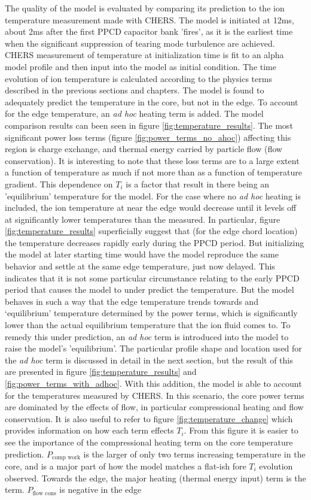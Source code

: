 The quality of the model is evaluated by comparing its prediction to the ion temperature measurement made with CHERS. The model is initiated at 12ms, about 2ms after the first PPCD capacitor bank 'fires', as it is the earliest time when the significant suppression of tearing mode turbulence are achieved. CHERS measurement of temperature at initialization time is fit to an alpha model profile and then input into the model as initial condition. The time evolution of ion temperature is calculated according to the physics terms described in the previous sections and chapters. The model is found to adequately predict the temperature in the core, but not in the edge. To account for the edge temperature, an \textit{ad hoc} heating term is added. The model comparison results can been seen in figure \ref{fig:temperature_results}.  The most significant power loss terms (figure \ref{fig:power_terms_no_ahoc}) affecting this region is charge exchange, and thermal energy carried by particle flow (flow conservation). It is interesting to note that these loss terms are to a large extent a function of temperature as much if not more than as a function of temperature gradient. This dependence on $T_i$ is a factor that result in there being an 'equilibrium' temperature for the model. For the case where no \textit{ad hoc} heating is included, the ion temperature at near the edge would decrease until it levels off at significantly lower temperatures than the measured. In particular, figure \ref{fig:temperature_results} superficially suggest that (for the edge chord location) the temperature decreases rapidly early during the PPCD period. But initializing the model at later starting time would have the model reproduce the same behavior and settle at the same edge temperature, just now delayed. This indicates that it is not some particular circumstance relating to the early PPCD period that causes the model to under predict the temperature. But the model behaves in such a way that the edge temperature trends towards and `equilibrium' temperature determined by the power terms, which is significantly lower than the actual equilibrium temperature that the ion fluid comes to. To remedy this under prediction, an \textit{ad hoc} term is introduced into the model to raise the model's 'equilibrium'. The particular profile shape and location used for the \textit{ad hoc} term is discussed in detail in the next section, but the result of this are presented in figure \ref{fig:temperature_results} and \ref{fig:power_terms_with_adhoc}. With this addition, the model is able to account for the temperatures measured by CHERS. In this scenario, the core power terms are dominated by the effects of flow, in particular compressional heating and flow conservation. It is also useful to refer to figure \ref{fig:temperature_change} which provides information on how each term effects $T_i$. From this figure it is easier to see the importance of the compressional heating term on the core temperature prediction. $P_{\text{comp work}}$ is the larger of only two terms increasing temperature in the core, and is a major part of how the model matches a flat-ish fore $T_i$ evolution observed. Towards the edge, the major heating (thermal energy input) term is the  term. $P_{\text{flow cons}}$ is negative in the edge 